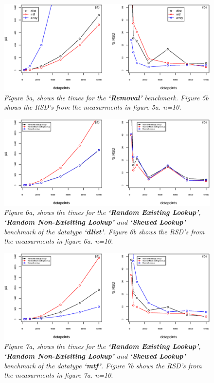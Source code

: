 \documentclass[a4paper,11pt,twoside]{article}
\begin{document}
\begin{figure}[H] 
\centering 
\includegraphics[width=\textwidth]{figures/fig5.eps}
\caption{\textit{Figure 5a, shows the times for the \textbf{`Removal'}
    benchmark. Figure 5b shows the RSD's from the measurments in figure 5a. n=10.}}
\end{figure}

\begin{figure}[H] 
\centering 
\includegraphics[width=\textwidth]{figures/fig6.eps}
\caption{\textit{Figure 6a, shows the times for the \textbf{`Random Existing
    Lookup'}, \textbf{`Random Non-Exisiting Lookup'} and
  \textbf{`Skewed Lookup'} benchmark of the datatype \textbf{`dlist'}. Figure 6b shows the RSD's from the measurments
in figure 6a. n=10.}}
\end{figure}

\begin{figure}[H] 
\centering 
\includegraphics[width=\textwidth]{figures/fig7.eps}
\caption{\textit{Figure 7a, shows the times for the \textbf{`Random Existing
    Lookup'}, \textbf{`Random Non-Exisiting Lookup'} and
  \textbf{`Skewed Lookup'} benchmark of the datatype \textbf{`mtf'}. Figure 7b shows the RSD's from the measurments
in figure 7a. n=10.}}
\end{figure}
\end{document}
